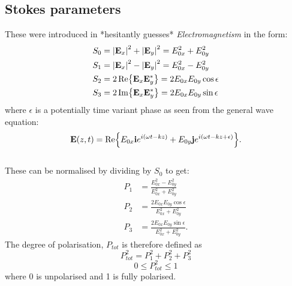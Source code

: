 \subsection{Stokes parameters}
These were introduced in *hesitantly guesses* \textit{Electromagnetism} in the form:
\begin{align*}
S_0 &= \abs{\vb{E}_x}^2 + \abs{\vb{E}_y}^2 = E_{0x}^2 + E_{0y}^2 \\
S_1 &= \abs{\vb{E}_x}^2 - \abs{\vb{E}_y}^2 =  E_{0x}^2 - E_{0y}^2 \\
S_2 &= 2\Re{\vb{E}_x\vb{E}_y^*} = 2E_{0x}E_{0y}\cos{\epsilon} \\
S_3 &= 2\Im{\vb{E}_x\vb{E}_y^*} = 2E_{0x}E_{0y}\sin{\epsilon}
\end{align*}
where \(\epsilon\) is a potentially time variant phase as seen from the general wave equation:
\begin{equation*}
\vb{E}(z,t) = \Re{E_{0x}\vb{i}e^{i(\omega{t} - kz)} + E_{0y}\vb{j}e^{i(\omega{t} - kz + \epsilon)}}.
\end{equation*}
\\
These can be normalised by dividing by \(S_0\) to get:
\begin{align*}
P_1 &= \frac{E_{0x}^2 - E_{0y}^2}{E_{0x}^2 + E_{0y}^2} \\
P_2 &= \frac{2E_{0x}E_{0y}\cos{\epsilon}}{E_{0x}^2 + E_{0y}^2} \\
P_3 &= \frac{2E_{0x}E_{0y}\sin{\epsilon}}{E_{0x}^2 + E_{0y}^2}.
\end{align*}
The degree of polarisation, \(P_{tot}\) is therefore defined as
\[P_{tot}^2 = P_{1}^2 + P_{2}^2 + P_{3}^2\] 
\[ 0 \leq P_{tot}^2 \leq 1\]
where 0 is unpolarised and 1 is fully polarised.
